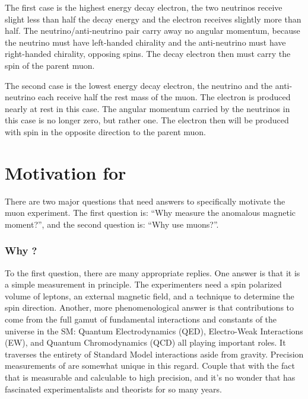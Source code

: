 The first case is the highest energy decay electron, the two neutrinos receive slight less than half the decay energy and the electron receives slightly more than half.  The neutrino/anti-neutrino pair carry away no angular momentum, because the neutrino must have left-handed chirality and the anti-neutrino must have right-handed chirality, opposing spins.  The decay electron then must carry the spin of the parent muon.

The second case is the lowest energy decay electron, the neutrino and the anti-neutrino each receive half the rest mass of the muon.  The electron is produced nearly at rest in this case.  The angular momentum carried by the neutrinos in this case is no longer zero, but rather one.  The electron then will be produced with spin in the opposite direction to the parent muon.

\section{Motivation for \mugmtwo}
There are two major questions that need answers to specifically motivate the muon \gmtwo experiment.  The first question is: ``Why measure the anomalous magnetic moment?'', and the second question is: ``Why use muons?''.

\subsubsection{Why \gmtwo?}
To the first question, there are many appropriate replies.  One answer is that it is a simple measurement in principle.  The experimenters need a spin polarized volume of leptons, an external magnetic field, and a technique to determine the spin direction. Another, more phenomenological answer is that contributions to \gmtwo come from the full gamut of fundamental interactions and constants of the universe in the SM: Quantum Electrodynamics (QED), Electro-Weak Interactions (EW), and Quantum Chromodynamics (QCD) all playing important roles. It traverses the entirety of Standard Model interactions aside from gravity. Precision measurements of \gmtwo are somewhat unique in this regard.  Couple that with the fact that \gmtwo is measurable and calculable to high precision, and it's no wonder that \gmtwo  has fascinated experimentalists and theorists for so many years.

